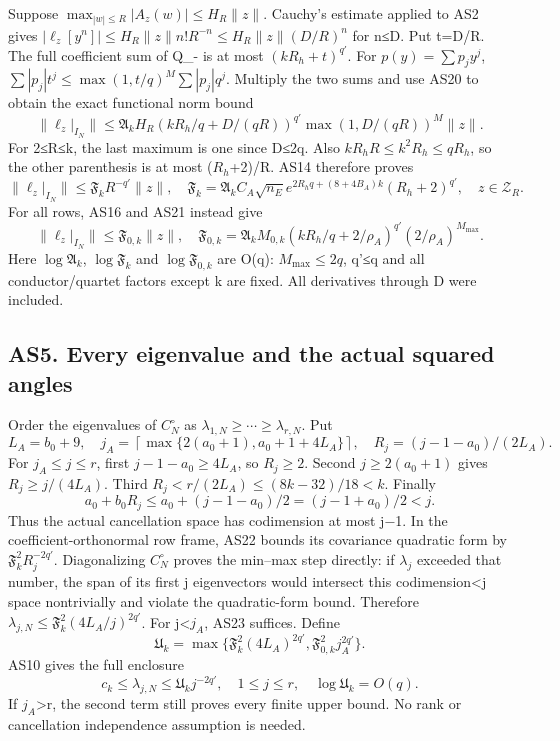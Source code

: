 \documentclass[11pt]{article}
\begin{document}
Suppose \(\max_{|w|\le R}|A_z(w)|\le H_R\|z\|\). Cauchy's estimate applied to AS2 gives \(|\ell_z[y^n]|\le H_R\|z\|n!R^{-n}\le H_R\|z\|(D/R)^n\) for n≤D. Put t=D/R. The full coefficient sum of Q\_- is at most \((kR_h+t)^{q'}\). For \(p(y)=\sum p_jy^j\), \(\sum|p_j|t^j\le\max(1,t/q)^M\sum|p_j|q^j\). Multiply the two sums and use AS20 to obtain the exact functional norm bound \[
\|\ell_z|_{I_N}\|\le\mathfrak A_kH_R
\left(kR_h/q+D/(qR)\right)^{q'}
\max(1,D/(qR))^M\|z\|.
\tag{AS21}
\] For 2≤R≤k, the last maximum is one since D≤2q. Also \(kR_hR\le k^2R_h\le qR_h\), so the other parenthesis is at most (\(R_h\)+2)/R. AS14 therefore proves \[
\|\ell_z|_{I_N}\|\le\mathfrak F_kR^{-q'}\|z\|,
\quad\mathfrak F_k=\mathfrak A_kC_A\sqrt{n_E}
e^{2R_hq+(8+4B_A)k}(R_h+2)^{q'},\quad z\in\mathcal Z_R.
\tag{AS22}
\] For all rows, AS16 and AS21 instead give \[
\|\ell_z|_{I_N}\|\le\mathfrak F_{0,k}\|z\|,
\quad\mathfrak F_{0,k}=\mathfrak A_kM_{0,k}
(kR_h/q+2/\rho_A)^{q'}(2/\rho_A)^{M_{\max}}.
\tag{AS23}
\] Here \(\log\mathfrak A_k\), \(\log\mathfrak F_k\) and \(\log\mathfrak F_{0,k}\) are O(q): \(M_{\max}\le2q\), q'≤q and all conductor/quartet factors except k are fixed. All derivatives through D were included.

\subsection{AS5. Every eigenvalue and the actual squared angles}\label{as5.-every-eigenvalue-and-the-actual-squared-angles}

Order the eigenvalues of \(C_N^\circ\) as \(\lambda_{1,N}\ge\cdots\ge\lambda_{r,N}\). Put \[
L_A=b_0+9,\quad
j_A=\left\lceil\max\{2(a_0+1),a_0+1+4L_A\}\right\rceil,
\quad R_j=(j-1-a_0)/(2L_A).
\tag{AS24}
\] For \(j_A\le j\le r\), first \(j-1-a_0\ge4L_A\), so \(R_j\ge2\). Second \(j\ge2(a_0+1)\) gives \(R_j\ge j/(4L_A)\). Third \(R_j<r/(2L_A)\le(8k-32)/18<k\). Finally \[
a_0+b_0R_j
\le a_0+(j-1-a_0)/2=(j-1+a_0)/2<j.
\] Thus the actual cancellation space has codimension at most j−1. In the coefficient-orthonormal row frame, AS22 bounds its covariance quadratic form by \(\mathfrak F_k^2R_j^{-2q'}\). Diagonalizing \(C_N^\circ\) proves the min--max step directly: if \(\lambda _j\) exceeded that number, the span of its first j eigenvectors would intersect this codimension\textless j space nontrivially and violate the quadratic-form bound. Therefore \(\lambda_{j,N}\le\mathfrak F_k^2(4L_A/j)^{2q'}\). For j\textless{}\(j_A\), AS23 suffices. Define \[
\mathfrak U_k=\max\{\mathfrak F_k^2(4L_A)^{2q'},
\mathfrak F_{0,k}^2j_A^{2q'}\}.
\] AS10 gives the full enclosure \[
c_k\le\lambda_{j,N}\le\mathfrak U_kj^{-2q'},
\quad1\le j\le r,\quad\log\mathfrak U_k=O(q).
\tag{AS25}
\] If \(j_A\)\textgreater r, the second term still proves every finite upper bound. No rank or cancellation independence assumption is needed.
\end{document}
